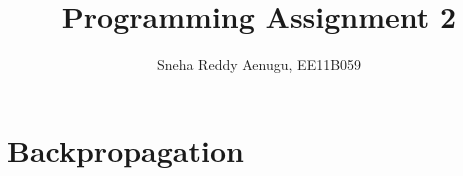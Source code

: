 \documentclass[12pt]{article}
\begin{document}
 
 
 
\title{Programming Assignment 2}%
\author{Sneha Reddy Aenugu, EE11B059\\ %
} %
 
\maketitle

\section{Backpropagation}
 
\end{document}

